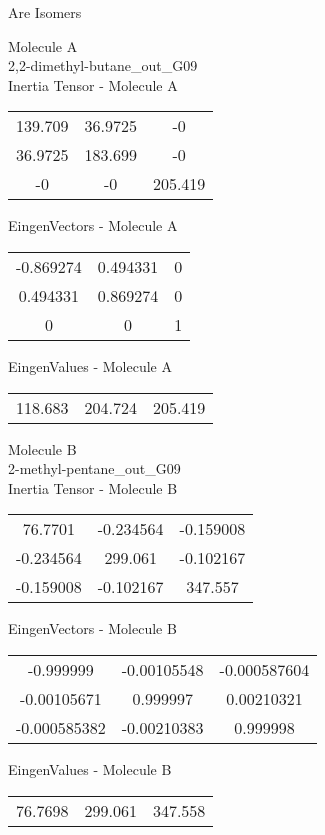 \begin{center}
\vtab
\vtab
\textcolor{NavyBlue}{\Large Are Isomers}
\end{center}
\newpage
\begin{multicols}{2}
\begin{center}
Molecule A \\ 
2,2-dimethyl-butane\_out\_G09
\\
Inertia Tensor - Molecule A \\
\vtab
\begin{tabular}{|c c c|}
139.709	 & 	36.9725	 & 	-0	 \\
36.9725	 & 	183.699	 & 	-0	 \\
-0	 & 	-0	 & 	205.419
\end{tabular}

\vtab
 EingenVectors - Molecule A     \\
\vtab
\begin{tabular}{|c c c|}
-0.869274	 & 	0.494331	 & 	0	 \\
0.494331	 & 	0.869274	 & 	0	 \\
0	 & 	0	 & 	1
\end{tabular}

\vtab
 EingenValues - Molecule A     \\
\vtab
\begin{tabular}{|c c c|}
118.683	 & 	204.724	 & 	205.419
\end{tabular}
\columnbreak

Molecule B \\ 
2-methyl-pentane\_out\_G09
\\
Inertia Tensor - Molecule B \\
\vtab
\begin{tabular}{|c c c|}
76.7701	 & 	-0.234564	 & 	-0.159008	 \\
-0.234564	 & 	299.061	 & 	-0.102167	 \\
-0.159008	 & 	-0.102167	 & 	347.557
\end{tabular}

\vtab
 EingenVectors - Molecule B     \\
\vtab
\begin{tabular}{|c c c|}
-0.999999	 & 	-0.00105548	 & 	-0.000587604	 \\
-0.00105671	 & 	0.999997	 & 	0.00210321	 \\
-0.000585382	 & 	-0.00210383	 & 	0.999998
\end{tabular}

\vtab
 EingenValues - Molecule B     \\
\vtab
\begin{tabular}{|c c c|}
76.7698	 & 	299.061	 & 	347.558
\end{tabular}

\end{center}
\end{multicols}
